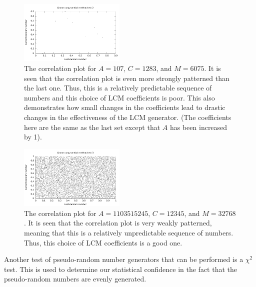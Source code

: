 \documentclass[twocolumn]{myarticle}
\begin{document}
\begin{figure}[ht!]
    \begin{center}
    \includegraphics[width = 0.45\textwidth]{../Plots/LCM_test_2.pdf}
    \caption{%
        The correlation plot for $ A = 107 $, $ C = 1283 $, and $ M = 6075 $.
        It is seen that the correlation plot is even more strongly patterned than the last one.
        Thus, this is a relatively predictable sequence of numbers and this choice of LCM coefficients is poor.
        This also demonstrates how small changes in the coefficients lead to drastic changes in the effectiveness of the LCM generator.
        (The coefficients here are the same as the last set except that $ A $ has been increased by 1).
    }
    \label{fig:lcm_test_2}
    \end{center}
\end{figure}

\begin{figure}[ht!]
    \begin{center}
    \includegraphics[width = 0.45\textwidth]{../Plots/LCM_test_3.pdf}
    \caption{%
        The correlation plot for $ A = 1103515245 $, $ C = 12345 $, and $ M = 32768 $.
        It is seen that the correlation plot is very weakly patterned, meaning that this is a relatively unpredictable sequence of numbers.
        Thus, this choice of LCM coefficients is a good one.
    }
    \label{fig:lcm_test_3}
    \end{center}
\end{figure}

Another test of pseudo-random number generators that can be performed is a $ \chi^2 $ test.
This is used to determine our statistical confidence in the fact that the pseudo-random numbers are evenly generated.
\end{document}
